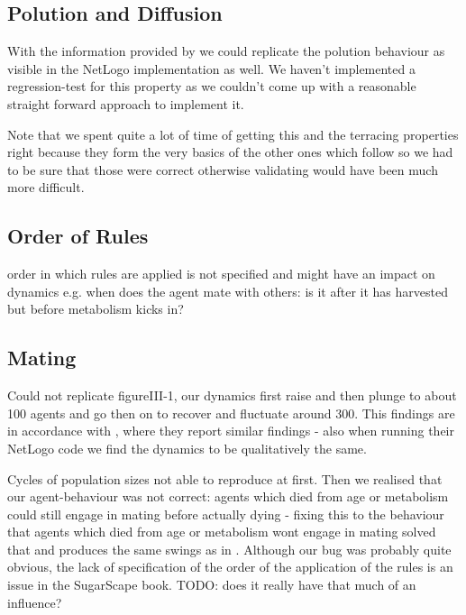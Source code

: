 \subsection{Polution and Diffusion}
With the information provided by \cite{weaver_replicating_nodate} we could replicate the polution behaviour as visible in the NetLogo implementation as well. We haven't implemented a regression-test for this property as we couldn't come up with a reasonable straight forward approach to implement it.

Note that we spent quite a lot of time of getting this and the terracing properties right because they form the very basics of the other ones which follow so we had to be sure that those were correct otherwise validating would have been much more difficult.

\subsection{Order of Rules}
order in which rules are applied is not specified and might have an impact on dynamics e.g. when does the agent mate with others: is it after it has harvested but before metabolism kicks in?

\subsection{Mating}
Could not replicate figureIII-1, our dynamics first raise and then plunge to about 100 agents and go then on to recover and fluctuate around 300. This findings are in accordance with \cite{weaver_replicating_nodate}, where they report similar findings - also when running their NetLogo code we find the dynamics to be qualitatively the same.

Cycles of population sizes not able to reproduce at first. Then we realised that our agent-behaviour was not correct: agents which died from age or metabolism could still engage in mating before actually dying - fixing this to the behaviour that agents which died from age or metabolism wont engage in mating solved that and produces the same swings as in \cite{weaver_replicating_nodate}.
Although our bug was probably quite obvious, the lack of specification of the order of the application of the rules is an issue in the SugarScape book. TODO: does it really have that much of an influence?
